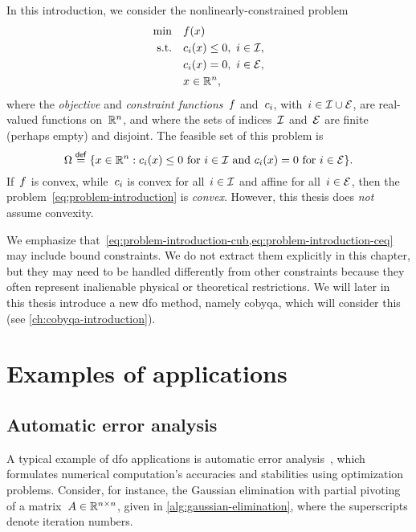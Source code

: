 In this introduction, we consider the nonlinearly-constrained problem
\begin{subequations}
    \label{eq:problem-introduction}
    \begin{align}
        \min        & \quad \obj(\iter)\\
        \text{s.t.} & \quad \con{i}(\iter) \le 0, ~ i \in \iub, \label{eq:problem-introduction-cub}\\
                    & \quad \con{i}(\iter) = 0, ~ i \in \ieq, \label{eq:problem-introduction-ceq}\\
                    & \quad \iter \in \R^n, \nonumber
    \end{align}
\end{subequations}
where the \emph{objective} and \emph{constraint functions}~$f$ and~$c_{i}$, with~$i \in \mathcal{I} \cup \mathcal{E}$, are real-valued functions on~$\mathbb{R}^n$, and where the sets of indices~$\mathcal{I}$ and~$\mathcal{E}$ are finite (perhaps empty) and disjoint.
The feasible set of this problem is
\begin{equation*}
    \fset \eqdef \set{\iter \in \R^n : \text{$\con{i}(\iter) \le 0$ for~$i \in \iub$ and~$\con{i}(\iter) = 0$ for~$i \in \ieq$}}.
\end{equation*}
If~$f$ is convex, while~$c_{i}$ is convex for all~$i \in \mathcal{I}$ and affine for all~$i \in \mathcal{E}$, then the problem~\cref{eq:problem-introduction} is \emph{convex}.
However, this thesis does \emph{not} assume convexity.

We emphasize that~\cref{eq:problem-introduction-cub,eq:problem-introduction-ceq} may include bound constraints.
We do not extract them explicitly in this chapter, but they may need to be handled differently from other constraints because they often represent inalienable physical or theoretical restrictions.
We will later in this thesis introduce a new \gls{dfo} method, namely \gls{cobyqa}, which will consider this (see \cref{ch:cobyqa-introduction}).

\section{Examples of applications}

\subsection{Automatic error analysis}

A typical example of \gls{dfo} applications is automatic error analysis~\cite{Higham_1993,Higham_2002}, which formulates numerical computation's accuracies and stabilities using optimization problems.
Consider, for instance, the Gaussian elimination with partial pivoting of a matrix~$A \in \mathbb{R}^{n \times n}$, given in \cref{alg:gaussian-elimination}, where the superscripts denote iteration numbers.


